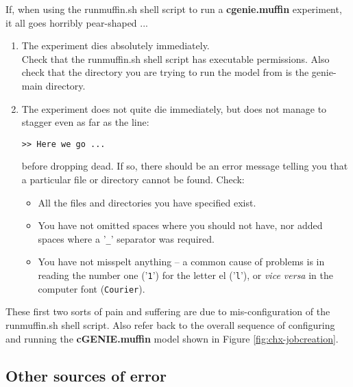 \documentclass[11pt,fleqn]{book} %
\begin{document}
If, when using the \textsf{\footnotesize runmuffin.sh} shell script to run a \textbf{cgenie.muffin} experiment, it all goes horribly pear-shaped ... 
\vspace{1mm}
\begin{enumerate}
   
\vspace{1mm}
\item The experiment dies absolutely immediately.
\\Check that the \textsf{\footnotesize runmuffin.sh} shell script has executable permissions. Also check that the directory you are trying to run the model from is the \textsf{\footnotesize genie-main} directory.
        
\item The experiment does not quite die immediately, but does not manage to stagger even as far as the line:
\vspace{-4pt}\begin{verbatim}
>> Here we go ...
\end{verbatim}\vspace{-4pt}
before dropping dead. If so, there should be an error message telling you that a particular file or directory cannot be found. Check:
        
\begin{itemize}
\item All the files and directories you have specified exist.
\item You have not omitted spaces where you should not have, nor added spaces where a '\texttt{\_}' separator was required.
\item You have not misspelt anything -- a common cause of problems is in reading the number one ('\texttt{1}') for the letter el ('\texttt{l}'), or \textit{vice versa} in the computer font (\texttt{Courier}).
\end{itemize}
        
\end{enumerate}
\vspace{2mm}

\noindent These first two sorts of pain and suffering are due to mis-configuration of the \textsf{\footnotesize runmuffin.sh} shell script. Also refer back to the overall sequence of configuring and running the \textbf{cGENIE.muffin} model shown in Figure \ref{fig:chx-jobcreation}.


\subsection{Other sources of error}
\end{document}

